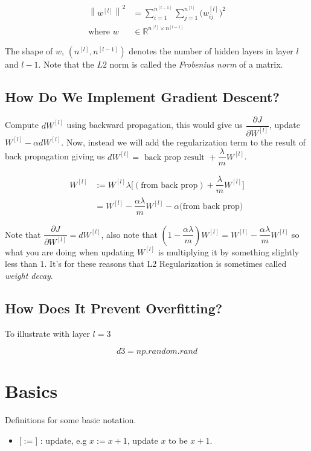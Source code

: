 \documentclass[12pt,reqno]{book}      %
\newcommand\norm[1]{\left\lVert#1\right\rVert}
\def\R{\mathbb{ R}}
\begin{document}
\begin{align}
\norm{w^{[l]}}^2 &= \sum_{i=1}^{n^{[l - 1]}} \sum_{j = 1}^{n^{[l]}}
	\big( w_{ij}^{[l]} \big)^2 \\
	\text{where } w &\in \R^{n^{[l]} \times n^{[l - 1]}}
\end{align}

The shape of $w$, $(n^{[l]}, n^{[l - 1]})$ denotes the number of hidden layers in layer $l$ and $l -1$. Note that the $L2$ norm is called the \textit{Frobenius norm} of a matrix.


\section{How Do We Implement Gradient Descent?}
Compute $dW^{[l]}$ using backward propagation, this would give us $\dfrac{\partial J}{\partial W^{[l]}}$, update $W^{[l]} - \alpha dW^{[l]}$. Now, instead we will add the regularization term to the result of back propagation giving us $dW^{[l]} = \text{ back prop result } + \dfrac{\lambda}{m} W^{[l]}$. 

\begin{align}
W^{[l]} &:= W^{[l]} \lambda \big[ (\text{from back prop}) + \dfrac{\lambda}{m} W^{[l]} \big] \\
	&= W^{[l]} - \dfrac{\alpha \lambda}{m} W^{[l]} - \alpha \text{(from back prop)}
\end{align}

Note that $\dfrac{\partial J}{\partial W^{[l]}} = dW^{[l]}$, also note that $(1- \dfrac{\alpha\lambda}{m}) W^{[l]} = W^{[l]} - \dfrac{\alpha\lambda}{m} W^{[l]}$ so what you are doing when updating $W^{[l]}$ is multiplying it by something slightly less than $1$. It's for these reasons that L2 Regularization is sometimes called \textit{weight decay}.

\section{How Does It Prevent Overfitting?}
To illustrate with layer $l=3$

\[
d3 = np.random.rand
\]

\appendix
\chapter{Basics}
Definitions for some basic notation.
\begin{itemize}
\item $\big[:=\big]$ : update, e.g $x := x + 1$, update $x$ to be $x +1$.
\end{itemize}
\end{document}
